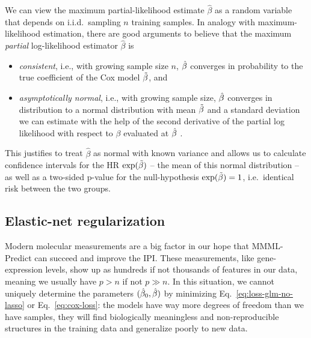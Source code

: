 We can view the maximum partial-likelihood estimate $\hat{\beta}$ as a random variable that depends 
on i.i.d.\ sampling $n$ training samples. In analogy with maximum-likelihood estimation, there are 
good arguments to believe that the maximum \textit{partial} log-likelihood estimator $\hat{\beta}$
is
\begin{itemize}  
    \item \textit{consistent}, i.e., with growing sample size $n$, $\hat{\beta}$ converges in 
        probability to the true coefficient of the Cox model $\tilde{\beta}$, and
    \item \textit{asymptotically normal}, i.e., with growing sample size, $\hat{\beta}$ converges 
        in distribution to a normal distribution with mean $\tilde{\beta}$ and a standard deviation we 
        can estimate with the help of the second derivative of the partial log likelihood with 
        respect to $\beta$ evaluated at $\hat{\beta}$ \cite[8.1--8.4]{klein03}.
\end{itemize}
This justifies to treat $\hat{\beta}$ as normal with known variance and allows us to
calculate confidence intervals for the HR $\exp(\tilde{\beta})$ -- the mean of this normal distribution -- 
as well as a two-sided p-value for the null-hypothesis $\exp(\tilde{\beta}) = 1$, i.e.\ identical risk 
between the two groups. 

\subsection{Elastic-net regularization} \label{subsec:elastic-net}

Modern molecular measurements are a big factor in our hope that MMML-Predict can succeed and improve 
the IPI. These measurements, like gene-expression levels, show up as hundreds if not thousands of 
features in our data, meaning we usually have $p > n$ if not $p \gg n$. In this situation, we 
cannot uniquely determine the parameters $(\hat{\beta}_0, \hat{\beta})$ by minimizing 
Eq.\ \eqref{eq:loss-glm-no-lasso} or Eq.\ \eqref{eq:cox-loss}:
the models have way more degrees of freedom than we have samples, they will find biologically 
meaningless and non-reproducible structures in the training data and generalize poorly to new 
data.

